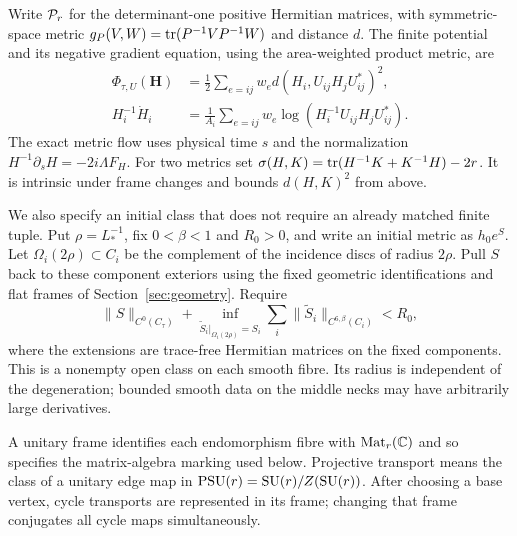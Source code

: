 Write $\mathcal P_r$ for the determinant-one positive
Hermitian matrices, with symmetric-space metric
$g_P(V,W)=\operatorname{tr}(P^{-1}VP^{-1}W)$ and distance $d$.
The finite potential and its negative gradient
equation, using the area-weighted product metric, are
\begin{equation}\label{eq:intro-finite}
 \begin{split}
 \Phi_{\tau,U}(\mathbf H)
   &=\frac12\sum_{e=ij}w_e
                d(H_i,U_{ij}H_jU_{ij}^*)^2,\\
 H_i^{-1}\dot H_i
   &=\frac1{A_i}\sum_{e=ij}w_e
                  \log(H_i^{-1}U_{ij}H_jU_{ij}^*).
 \end{split}
\end{equation}
The exact metric flow uses physical time $s$ and
the normalization $H^{-1}\partial_sH=-2i\Lambda F_H$.
For two metrics set
$\sigma(H,K)=\operatorname{tr}(H^{-1}K+K^{-1}H)-2r$.
It is intrinsic under frame changes and bounds
$d(H,K)^2$ from above.

We also specify an initial class that does not
require an already matched finite tuple. Put
$\rho=L_*^{-1}$, fix $0<\beta<1$ and $R_0>0$,
and write an initial metric as $h_0e^S$.
Let $\Omega_i(2\rho)\subset C_i$ be the complement
of the incidence discs of radius $2\rho$.
Pull $S$ back to these component exteriors using
the fixed geometric identifications and flat
frames of Section~\ref{sec:geometry}. Require
\begin{equation}\label{eq:intro-initial-class}
 \|S\|_{C^0(C_\tau)}
 +\inf_{\widetilde S_i|_{\Omega_i(2\rho)}=S_i}
           \sum_i\|\widetilde S_i\|_{C^{6,\beta}(C_i)}
 <R_0 ,
\end{equation}
where the extensions are trace-free Hermitian
matrices on the fixed components.
This is a nonempty open class on each smooth
fibre. Its radius is independent of the degeneration;
bounded smooth data on the middle necks may have
arbitrarily large derivatives.

A unitary frame identifies each endomorphism fibre
with $\operatorname{Mat}_r(\mathbb C)$ and so specifies
the matrix-algebra marking used below.
Projective transport means the class of a unitary
edge map in $\operatorname{PSU}(r)=\operatorname{SU}(r)/Z(\operatorname{SU}(r))$.
After choosing a base vertex, cycle transports
are represented in its frame; changing that
frame conjugates all cycle maps simultaneously.


